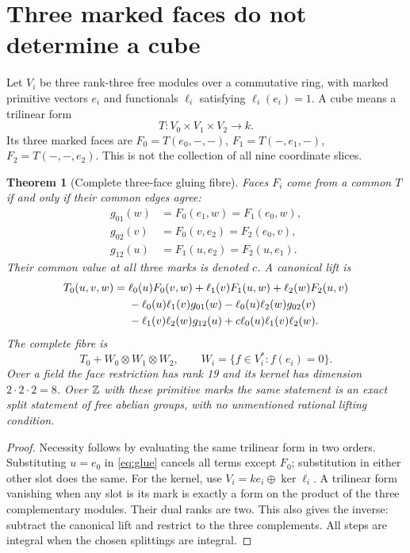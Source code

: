 \documentclass[11pt,reqno]{amsart}
\newtheorem{theorem}{Theorem}[section]
\theoremstyle{definition}\newtheorem{definition}[theorem]{Definition}
\theoremstyle{remark}\newtheorem{remark}[theorem]{Remark}
\begin{document}
\section{Three marked faces do not determine a cube}

Let $V_i$ be three rank-three free modules over a commutative ring, with marked
primitive vectors $e_i$ and functionals $\ell_i$ satisfying $\ell_i(e_i)=1$.
A cube means a trilinear form
\[
 T:V_0\times V_1\times V_2\longrightarrow k.
\]
Its three marked faces are $F_0=T(e_0,-,-)$, $F_1=T(-,e_1,-)$,
$F_2=T(-,-,e_2)$. This is not the collection of all nine coordinate slices.

\begin{theorem}[Complete three-face gluing fibre]\label{thm:glue}
Faces $F_i$ come from a common $T$ if and only if their common edges agree:
\begin{align*}
 g_{01}(w)&=F_0(e_1,w)=F_1(e_0,w),\\
 g_{02}(v)&=F_0(v,e_2)=F_2(e_0,v),\\
 g_{12}(u)&=F_1(u,e_2)=F_2(u,e_1).
\end{align*}
Their common value at all three marks is denoted $c$. A canonical lift is
\begin{align}
 T_0(u,v,w)={}&\ell_0(u)F_0(v,w)+\ell_1(v)F_1(u,w)+\ell_2(w)F_2(u,v)\notag\\
 &-\ell_0(u)\ell_1(v)g_{01}(w)-\ell_0(u)\ell_2(w)g_{02}(v)\notag\\
 &-\ell_1(v)\ell_2(w)g_{12}(u)+c\ell_0(u)\ell_1(v)\ell_2(w).\label{eq:glue}
\end{align}
The complete fibre is
\[
 T_0+W_0\otimes W_1\otimes W_2,\qquad W_i=\{f\in V_i^*:f(e_i)=0\}.
\]
Over a field the face restriction has rank 19 and its kernel has dimension
$2\cdot2\cdot2=8$. Over $\mathbb Z$ with these primitive marks the same statement is
an exact split statement of free abelian groups, with no unmentioned rational
lifting condition.
\end{theorem}
\begin{proof}
Necessity follows by evaluating the same trilinear form in two orders.
Substituting $u=e_0$ in \eqref{eq:glue} cancels all terms except $F_0$;
substitution in either other slot does the same. For the kernel, use
$V_i=ke_i\oplus\ker\ell_i$. A trilinear form vanishing when any slot is its
mark is exactly a form on the product of the three complementary modules.
Their dual ranks are two. This also gives the inverse: subtract the canonical
lift and restrict to the three complements. All steps are integral when the
chosen splittings are integral.
\end{proof}
\end{document}
